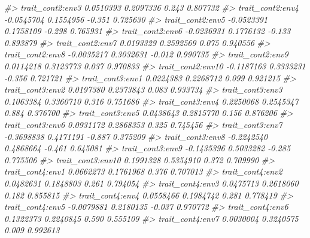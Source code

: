 \documentclass[
]{article}
\newenvironment{Shaded}{\begin{snugshade}}{\end{snugshade}}
\newcommand{\CommentTok}[1]{\textcolor[rgb]{0.56,0.35,0.01}{\textit{#1}}}
\begin{document}
\begin{Shaded}
\begin{Highlighting}[]
\CommentTok{\#\textgreater{} trait\_cont2:env3               0.0510393  0.2097336   0.243 0.807732    }
\CommentTok{\#\textgreater{} trait\_cont2:env4              {-}0.0545704  0.1554956  {-}0.351 0.725630    }
\CommentTok{\#\textgreater{} trait\_cont2:env5              {-}0.0523391  0.1758109  {-}0.298 0.765931    }
\CommentTok{\#\textgreater{} trait\_cont2:env6              {-}0.0236931  0.1776132  {-}0.133 0.893879    }
\CommentTok{\#\textgreater{} trait\_cont2:env7               0.0193329  0.2592569   0.075 0.940556    }
\CommentTok{\#\textgreater{} trait\_cont2:env8              {-}0.0035217  0.3032631  {-}0.012 0.990735    }
\CommentTok{\#\textgreater{} trait\_cont2:env9               0.0114218  0.3123773   0.037 0.970833    }
\CommentTok{\#\textgreater{} trait\_cont2:env10             {-}0.1187163  0.3333231  {-}0.356 0.721721    }
\CommentTok{\#\textgreater{} trait\_cont3:env1               0.0224383  0.2268712   0.099 0.921215    }
\CommentTok{\#\textgreater{} trait\_cont3:env2               0.0197380  0.2373843   0.083 0.933734    }
\CommentTok{\#\textgreater{} trait\_cont3:env3               0.1063384  0.3360710   0.316 0.751686    }
\CommentTok{\#\textgreater{} trait\_cont3:env4               0.2250068  0.2545347   0.884 0.376700    }
\CommentTok{\#\textgreater{} trait\_cont3:env5               0.0438643  0.2815770   0.156 0.876206    }
\CommentTok{\#\textgreater{} trait\_cont3:env6               0.0931172  0.2868353   0.325 0.745456    }
\CommentTok{\#\textgreater{} trait\_cont3:env7              {-}0.3698838  0.4171191  {-}0.887 0.375209    }
\CommentTok{\#\textgreater{} trait\_cont3:env8              {-}0.2242540  0.4868664  {-}0.461 0.645081    }
\CommentTok{\#\textgreater{} trait\_cont3:env9              {-}0.1435396  0.5033282  {-}0.285 0.775506    }
\CommentTok{\#\textgreater{} trait\_cont3:env10              0.1991328  0.5354910   0.372 0.709990    }
\CommentTok{\#\textgreater{} trait\_cont4:env1               0.0662273  0.1761968   0.376 0.707013    }
\CommentTok{\#\textgreater{} trait\_cont4:env2               0.0482631  0.1848803   0.261 0.794054    }
\CommentTok{\#\textgreater{} trait\_cont4:env3               0.0475713  0.2618060   0.182 0.855815    }
\CommentTok{\#\textgreater{} trait\_cont4:env4               0.0558466  0.1984742   0.281 0.778419    }
\CommentTok{\#\textgreater{} trait\_cont4:env5              {-}0.0079881  0.2180135  {-}0.037 0.970772    }
\CommentTok{\#\textgreater{} trait\_cont4:env6               0.1322373  0.2240845   0.590 0.555109    }
\CommentTok{\#\textgreater{} trait\_cont4:env7               0.0030004  0.3240575   0.009 0.992613    }

\end{Highlighting}
\end{Shaded}
\end{document}
